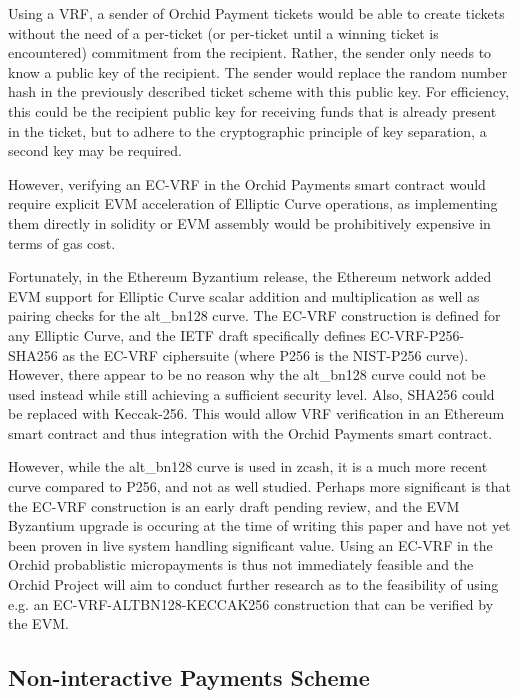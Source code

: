 Using a VRF, a sender of Orchid Payment tickets would be able to create tickets without the need of a per-ticket (or per-ticket until a winning ticket is encountered) commitment from the recipient. Rather, the sender only needs to know a public key of the recipient. The sender would replace the random number hash in the previously described ticket scheme with this public key. For efficiency, this could be the recipient public key for receiving funds that is already present in the ticket, but to adhere to the cryptographic principle of key separation, a second key may be required.

However, verifying an EC-VRF in the Orchid Payments smart contract would require explicit EVM acceleration of Elliptic Curve operations, as implementing them directly in solidity or EVM assembly would be prohibitively expensive in terms of gas cost.

Fortunately, in the Ethereum Byzantium\cite{ETHByz} release, the Ethereum network added EVM support for Elliptic Curve scalar addition and multiplication\cite{EIP196} as well as pairing checks\cite{EIP197} for the alt\_bn128 curve\cite{ALTBN128}. The EC-VRF construction is defined for any Elliptic Curve, and the IETF draft specifically defines EC-VRF-P256-SHA256 as the EC-VRF ciphersuite (where P256 is the NIST-P256 curve\cite{P256}). However, there appear to be no reason why the alt\_bn128 curve could not be used instead while still achieving a sufficient security level. Also, SHA256 could be replaced with Keccak-256. This would allow VRF verification in an Ethereum smart contract and thus integration with the Orchid Payments smart contract.

However, while the alt\_bn128 curve is used in zcash, it is a much more recent curve compared to P256, and not as well studied. Perhaps more significant is that the EC-VRF construction is an early draft pending review, and the EVM Byzantium upgrade is occuring at the time of writing this paper and have not yet been proven in live system handling significant value. Using an EC-VRF in the Orchid probablistic micropayments is thus not immediately feasible and the Orchid Project will aim to conduct further research as to the feasibility of using e.g. an EC-VRF-ALTBN128-KECCAK256 construction that can be verified by the EVM.

\subsection{Non-interactive Payments Scheme}

